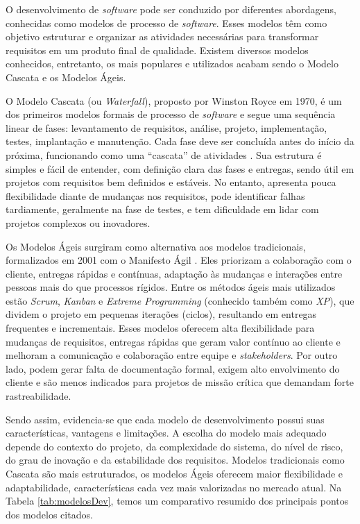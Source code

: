 \documentclass[english,brazilian]{UNISINOSartigo} %
\begin{document}
O desenvolvimento de \textit{software} pode ser conduzido por diferentes abordagens, conhecidas como modelos de processo de \textit{software}. Esses modelos têm como objetivo estruturar e organizar as atividades necessárias para transformar requisitos em um produto final de qualidade. Existem diversos modelos conhecidos, entretanto, os mais populares e utilizados acabam sendo o Modelo Cascata e os Modelos Ágeis.

O Modelo Cascata (ou \textit{Waterfall}), proposto por Winston Royce em 1970, é um dos primeiros modelos formais de processo de \textit{software} e segue uma sequência linear de fases: levantamento de requisitos, análise, projeto, implementação, testes, implantação e manutenção. Cada fase deve ser concluída antes do início da próxima, funcionando como uma “cascata” de atividades \cite{sommerville2011}. Sua estrutura é simples e fácil de entender, com definição clara das fases e entregas, sendo útil em projetos com requisitos bem definidos e estáveis. No entanto, apresenta pouca flexibilidade diante de mudanças nos requisitos, pode identificar falhas tardiamente, geralmente na fase de testes, e tem dificuldade em lidar com projetos complexos ou inovadores.

Os Modelos Ágeis surgiram como alternativa aos modelos tradicionais, formalizados em 2001 com o Manifesto Ágil \cite{beck2001}. Eles priorizam a colaboração com o cliente, entregas rápidas e contínuas, adaptação às mudanças e interações entre pessoas mais do que processos rígidos. Entre os métodos ágeis mais utilizados estão \textit{Scrum}, \textit{Kanban} e \textit{Extreme Programming} (conhecido também como \textit{XP}), que dividem o projeto em pequenas iterações (ciclos), resultando em entregas frequentes e incrementais. Esses modelos oferecem alta flexibilidade para mudanças de requisitos, entregas rápidas que geram valor contínuo ao cliente e melhoram a comunicação e colaboração entre equipe e \textit{stakeholders}. Por outro lado, podem gerar falta de documentação formal, exigem alto envolvimento do cliente e são menos indicados para projetos de missão crítica que demandam forte rastreabilidade.

Sendo assim, evidencia-se que cada modelo de desenvolvimento possui suas características, vantagens e limitações. A escolha do modelo mais adequado depende do contexto do projeto, da complexidade do sistema, do nível de risco, do grau de inovação e da estabilidade dos requisitos. Modelos tradicionais como Cascata são mais estruturados, os modelos Ágeis oferecem maior flexibilidade e adaptabilidade, características cada vez mais valorizadas no mercado atual. Na Tabela \ref{tab:modelosDev}, temos um comparativo resumido dos principais pontos dos modelos citados.
\end{document}
